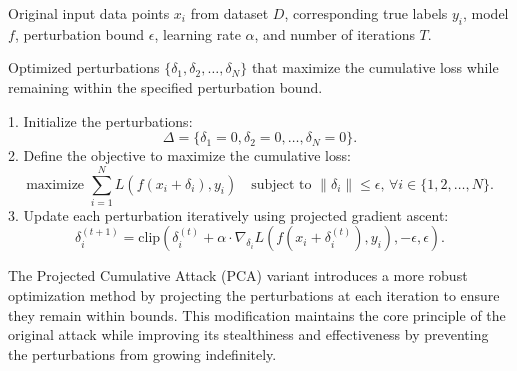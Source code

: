 Original input data points \( x_i \) from dataset \( D \), corresponding true labels \( y_i \), model \( f \), perturbation bound \( \epsilon \), learning rate \( \alpha \), and number of iterations \( T \).

Optimized perturbations \( \{\delta_1, \delta_2, \dots, \delta_N\} \) that maximize the cumulative loss while remaining within the specified perturbation bound.

1. Initialize the perturbations:
   \[
   \Delta = \{\delta_1 = 0, \delta_2 = 0, \ldots, \delta_N = 0\}.
   \]
2. Define the objective to maximize the cumulative loss:
   \[
   \text{maximize } \sum_{i=1}^{N} L(f(x_i + \delta_i), y_i) \quad \text{subject to } \|\delta_i\| \leq \epsilon, \, \forall i \in \{1, 2, \ldots, N\}.
   \]
3. Update each perturbation iteratively using projected gradient ascent:
   \[
   \delta_i^{(t+1)} = \text{clip}(\delta_i^{(t)} + \alpha \cdot \nabla_{\delta_i} L(f(x_i + \delta_i^{(t)}), y_i), -\epsilon, \epsilon).
   \]

The Projected Cumulative Attack (PCA) variant introduces a more robust optimization method by projecting the perturbations at each iteration to ensure they remain within bounds. This modification maintains the core principle of the original attack while improving its stealthiness and effectiveness by preventing the perturbations from growing indefinitely.